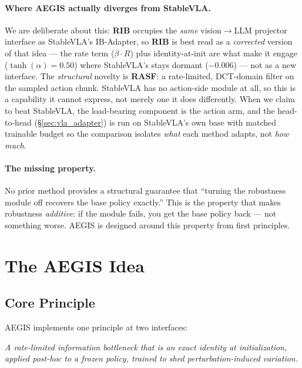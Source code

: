\documentclass[11pt,a4paper]{article}
\newcommand{\rib}{\textbf{RIB}}
\newcommand{\rasf}{\textbf{RASF}}
\begin{document}
\paragraph{Where AEGIS actually diverges from StableVLA.}
We are deliberate about this: \rib{} occupies the \emph{same} vision$\to$LLM projector
interface as StableVLA's IB-Adapter, so \rib{} is best read as a \emph{corrected} version of
that idea — the rate term ($\beta\cdot R$) plus identity-at-init are what make it engage
($\tanh(\alpha)\!=\!0.50$) where StableVLA's stays dormant ($-0.006$) — not as a new interface.
The \emph{structural} novelty is \rasf{}: a rate-limited, DCT-domain filter on the sampled
action chunk. StableVLA has no action-side module at all, so this is a capability it cannot
express, not merely one it does differently. When we claim to beat StableVLA, the load-bearing
component is the action arm, and the head-to-head (§\ref{sec:vla_adapter}) is run on
StableVLA's own base with matched trainable budget so the comparison isolates \emph{what}
each method adapts, not \emph{how much}.

\paragraph{The missing property.}
No prior method provides a structural guarantee that ``turning the robustness module off
recovers the base policy exactly.'' This is the property that makes robustness \emph{additive}:
if the module fails, you get the base policy back — not something worse.
AEGIS is designed around this property from first principles.

\section{The AEGIS Idea}
\label{sec:idea}

\subsection{Core Principle}

AEGIS implements one principle at two interfaces:
\begin{center}
\textit{A rate-limited information bottleneck that is an exact identity at initialization,\\
applied post-hoc to a frozen policy, trained to shed perturbation-induced variation.}
\end{center}
\end{document}
